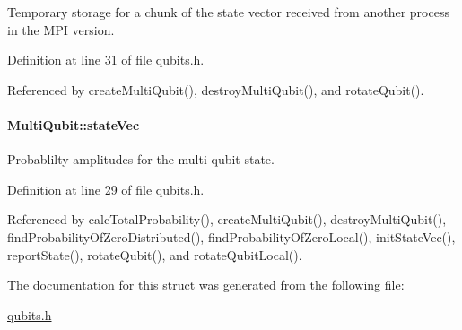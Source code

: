Temporary storage for a chunk of the state vector received from another process in the M\+PI version. 



Definition at line 31 of file qubits.\+h.



Referenced by create\+Multi\+Qubit(), destroy\+Multi\+Qubit(), and rotate\+Qubit().

\paragraph[{\texorpdfstring{state\+Vec}{stateVec}}]{ Multi\+Qubit\+::state\+Vec}\hypertarget{structMultiQubit_a45483190d6b01ef6b2f98f2bec9ab94f}{}\label{structMultiQubit_a45483190d6b01ef6b2f98f2bec9ab94f}


Probablilty amplitudes for the multi qubit state. 



Definition at line 29 of file qubits.\+h.



Referenced by calc\+Total\+Probability(), create\+Multi\+Qubit(), destroy\+Multi\+Qubit(), find\+Probability\+Of\+Zero\+Distributed(), find\+Probability\+Of\+Zero\+Local(), init\+State\+Vec(), report\+State(), rotate\+Qubit(), and rotate\+Qubit\+Local().



The documentation for this struct was generated from the following file\+:\begin{DoxyCompactItemize}
\item 
\hyperlink{qubits_8h}{qubits.\+h}\end{DoxyCompactItemize}
